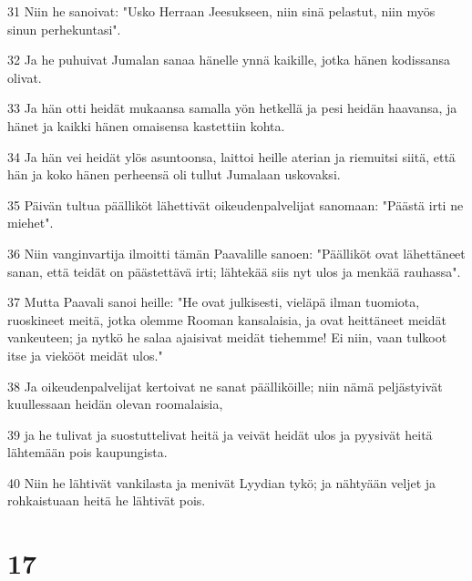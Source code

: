 \par 31 Niin he sanoivat: "Usko Herraan Jeesukseen, niin sinä pelastut, niin myös sinun perhekuntasi".
\par 32 Ja he puhuivat Jumalan sanaa hänelle ynnä kaikille, jotka hänen kodissansa olivat.
\par 33 Ja hän otti heidät mukaansa samalla yön hetkellä ja pesi heidän haavansa, ja hänet ja kaikki hänen omaisensa kastettiin kohta.
\par 34 Ja hän vei heidät ylös asuntoonsa, laittoi heille aterian ja riemuitsi siitä, että hän ja koko hänen perheensä oli tullut Jumalaan uskovaksi.
\par 35 Päivän tultua päälliköt lähettivät oikeudenpalvelijat sanomaan: "Päästä irti ne miehet".
\par 36 Niin vanginvartija ilmoitti tämän Paavalille sanoen: "Päälliköt ovat lähettäneet sanan, että teidät on päästettävä irti; lähtekää siis nyt ulos ja menkää rauhassa".
\par 37 Mutta Paavali sanoi heille: "He ovat julkisesti, vieläpä ilman tuomiota, ruoskineet meitä, jotka olemme Rooman kansalaisia, ja ovat heittäneet meidät vankeuteen; ja nytkö he salaa ajaisivat meidät tiehemme! Ei niin, vaan tulkoot itse ja viekööt meidät ulos."
\par 38 Ja oikeudenpalvelijat kertoivat ne sanat päälliköille; niin nämä peljästyivät kuullessaan heidän olevan roomalaisia,
\par 39 ja he tulivat ja suostuttelivat heitä ja veivät heidät ulos ja pyysivät heitä lähtemään pois kaupungista.
\par 40 Niin he lähtivät vankilasta ja menivät Lyydian tykö; ja nähtyään veljet ja rohkaistuaan heitä he lähtivät pois.

\chapter{17}


